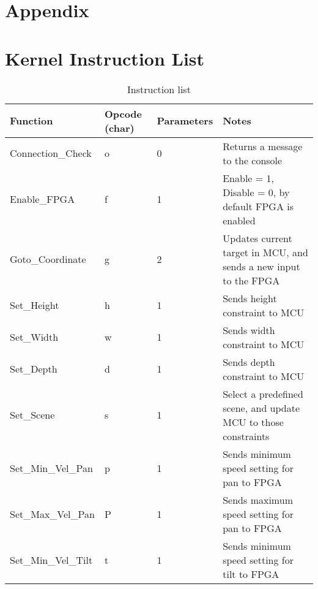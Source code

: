 \section{Appendix}

\appendix
\section{Kernel Instruction List}
\label{sec:KernelInstructionList}

\begin{table}[h]
	\centering
	\caption{Instruction list}
	\label{InstructionList}


    \begin{tabular}{ | l | l | l | p{5cm} |}
    \hline
    Function &  Opcode (char) & Parameters & Notes \\ 
    \hline
    
    Connection\_Check & o & 0 & Returns a message to the console \\
    \hline
    
    Enable\_FPGA & f & 1 & Enable = 1, Disable = 0, by default FPGA is enabled \\
    \hline
    
     Goto\_Coordinate & g & 2 & Updates current target in MCU, and sends a new input to    		the FPGA  \\
    \hline
    
    Set\_Height & h & 1 & Sends height constraint to MCU \\
    \hline

    Set\_Width & w & 1 & Sends width constraint to MCU \\
    \hline
    
    Set\_Depth & d & 1 & Sends depth constraint to MCU \\
    \hline
    
     Set\_Scene & s & 1 & Select a predefined scene, and update MCU to those constraints \\
    \hline
    
     Set\_Min\_Vel\_Pan & p & 1 & Sends minimum speed setting for pan to FPGA \\
    \hline
    
     Set\_Max\_Vel\_Pan & P & 1 & Sends maximum speed setting for pan to FPGA \\
    \hline
    
     Set\_Min\_Vel\_Tilt & t & 1 & Sends minimum speed setting for tilt to FPGA \\
    \hline
    

\end{tabular}
\end{table}
